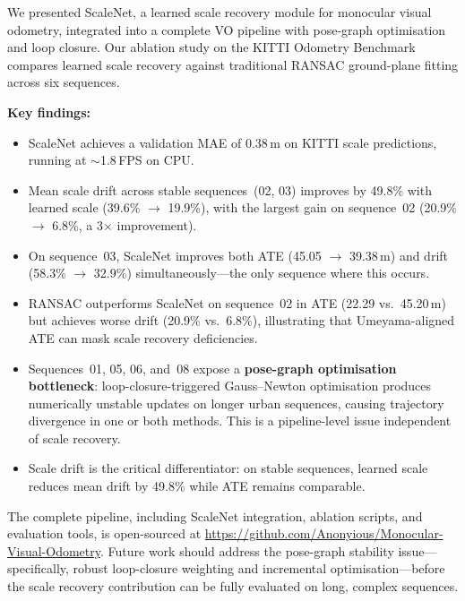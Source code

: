 \documentclass[12pt,a4paper]{article}
\begin{document}
We presented ScaleNet, a learned scale recovery module for monocular visual odometry, integrated into a complete VO pipeline with pose-graph optimisation and loop closure. Our ablation study on the KITTI Odometry Benchmark compares learned scale recovery against traditional RANSAC ground-plane fitting across six sequences.

\textbf{Key findings:}
\begin{itemize}
    \item ScaleNet achieves a validation MAE of 0.38\,m on KITTI scale predictions, running at $\sim$1.8\,FPS on CPU.
    \item Mean scale drift across stable sequences~(02, 03) improves by 49.8\% with learned scale (39.6\% $\to$ 19.9\%), with the largest gain on sequence~02 (20.9\% $\to$ 6.8\%, a 3$\times$ improvement).
    \item On sequence~03, ScaleNet improves both ATE (45.05 $\to$ 39.38\,m) and drift (58.3\% $\to$ 32.9\%) simultaneously---the only sequence where this occurs.
    \item RANSAC outperforms ScaleNet on sequence~02 in ATE (22.29 vs.\ 45.20\,m) but achieves worse drift (20.9\% vs.\ 6.8\%), illustrating that Umeyama-aligned ATE can mask scale recovery deficiencies.
    \item Sequences~01, 05, 06, and~08 expose a \textbf{pose-graph optimisation bottleneck}: loop-closure-triggered Gauss--Newton optimisation produces numerically unstable updates on longer urban sequences, causing trajectory divergence in one or both methods. This is a pipeline-level issue independent of scale recovery.
    \item Scale drift is the critical differentiator: on stable sequences, learned scale reduces mean drift by 49.8\% while ATE remains comparable.
\end{itemize}

The complete pipeline, including ScaleNet integration, ablation scripts, and evaluation tools, is open-sourced at \url{https://github.com/Anonyious/Monocular-Visual-Odometry}. Future work should address the pose-graph stability issue---specifically, robust loop-closure weighting and incremental optimisation---before the scale recovery contribution can be fully evaluated on long, complex sequences.
\end{document}
